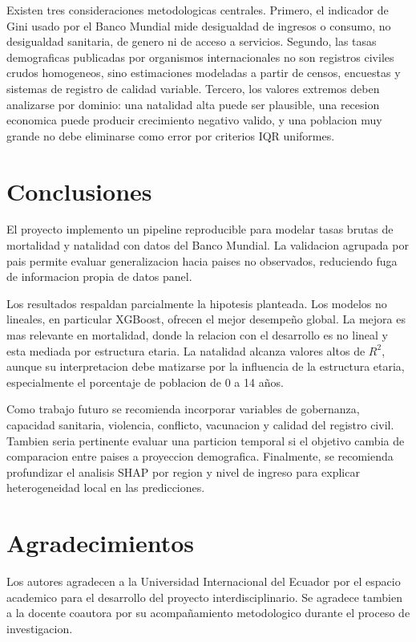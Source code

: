 \documentclass[conference]{IEEEtran}
\begin{document}
Existen tres consideraciones metodologicas centrales. Primero, el indicador de Gini usado por el Banco Mundial mide desigualdad de ingresos o consumo, no desigualdad sanitaria, de genero ni de acceso a servicios. Segundo, las tasas demograficas publicadas por organismos internacionales no son registros civiles crudos homogeneos, sino estimaciones modeladas a partir de censos, encuestas y sistemas de registro de calidad variable. Tercero, los valores extremos deben analizarse por dominio: una natalidad alta puede ser plausible, una recesion economica puede producir crecimiento negativo valido, y una poblacion muy grande no debe eliminarse como error por criterios IQR uniformes.

\section{Conclusiones}

El proyecto implemento un pipeline reproducible para modelar tasas brutas de mortalidad y natalidad con datos del Banco Mundial. La validacion agrupada por pais permite evaluar generalizacion hacia paises no observados, reduciendo fuga de informacion propia de datos panel.

Los resultados respaldan parcialmente la hipotesis planteada. Los modelos no lineales, en particular XGBoost, ofrecen el mejor desempeño global. La mejora es mas relevante en mortalidad, donde la relacion con el desarrollo es no lineal y esta mediada por estructura etaria. La natalidad alcanza valores altos de \(R^2\), aunque su interpretacion debe matizarse por la influencia de la estructura etaria, especialmente el porcentaje de poblacion de 0 a 14 años.

Como trabajo futuro se recomienda incorporar variables de gobernanza, capacidad sanitaria, violencia, conflicto, vacunacion y calidad del registro civil. Tambien seria pertinente evaluar una particion temporal si el objetivo cambia de comparacion entre paises a proyeccion demografica. Finalmente, se recomienda profundizar el analisis SHAP por region y nivel de ingreso para explicar heterogeneidad local en las predicciones.

\section*{Agradecimientos}

Los autores agradecen a la Universidad Internacional del Ecuador por el espacio academico para el desarrollo del proyecto interdisciplinario. Se agradece tambien a la docente coautora por su acompañamiento metodologico durante el proceso de investigacion.



\end{document}
